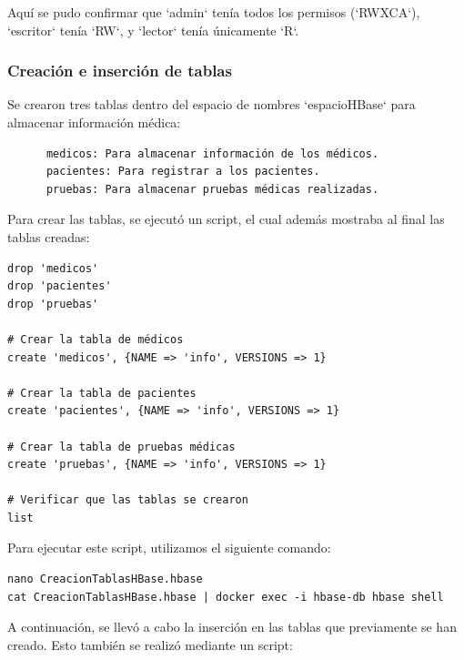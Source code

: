 \documentclass{article}
\begin{document}
Aquí se pudo confirmar que `admin` tenía todos los permisos (`RWXCA`), `escritor` tenía `RW`, y `lector` tenía únicamente `R`.


\subsubsection{Creación e inserción de tablas}

Se crearon tres tablas dentro del espacio de nombres `espacioHBase` para almacenar información médica: 

\begin{verbatim}
      medicos: Para almacenar información de los médicos.
      pacientes: Para registrar a los pacientes.
      pruebas: Para almacenar pruebas médicas realizadas.
\end{verbatim}

Para crear las tablas, se ejecutó un script, el cual además mostraba al final las tablas creadas:

\begin{verbatim}
drop 'medicos'
drop 'pacientes'
drop 'pruebas'
    
# Crear la tabla de médicos
create 'medicos', {NAME => 'info', VERSIONS => 1}
    
# Crear la tabla de pacientes
create 'pacientes', {NAME => 'info', VERSIONS => 1}
    
# Crear la tabla de pruebas médicas
create 'pruebas', {NAME => 'info', VERSIONS => 1}
    
# Verificar que las tablas se crearon
list    
\end{verbatim}

Para ejecutar este script, utilizamos el siguiente comando:
\begin{lstlisting}[style=bashStyle]
nano CreacionTablasHBase.hbase
cat CreacionTablasHBase.hbase | docker exec -i hbase-db hbase shell
\end{lstlisting}

A continuación, se llevó a cabo la inserción en las tablas que previamente se han creado. Esto también se realizó mediante un script:
\end{document}
